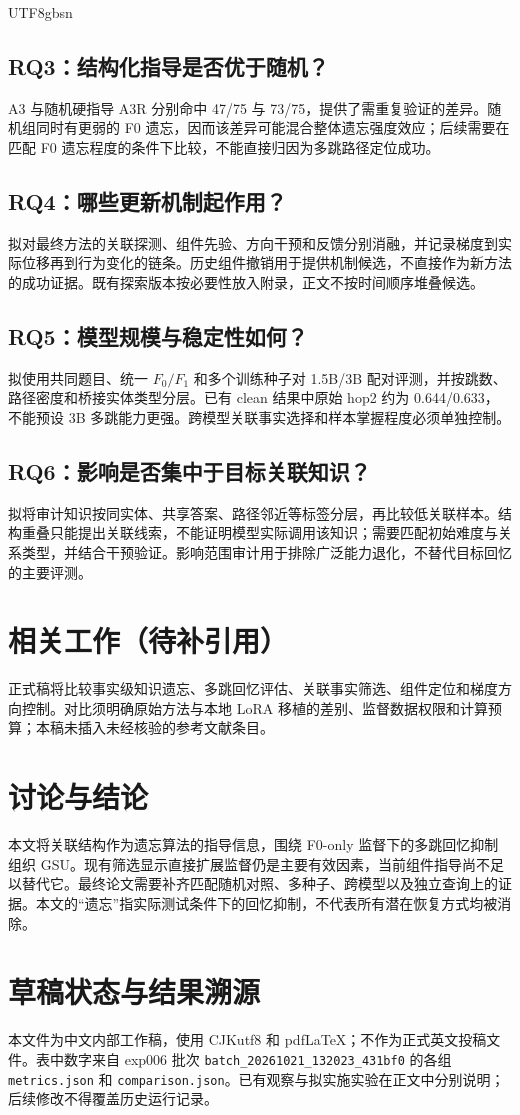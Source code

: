 \documentclass[sigconf,anonymous,review]{acmart}
\begin{document}
\begin{CJK*}{UTF8}{gbsn}
\subsection{RQ3：结构化指导是否优于随机？}
A3 与随机硬指导 A3R 分别命中 47/75 与 73/75，提供了需重复验证的差异。随机组同时有更弱的 F0 遗忘，因而该差异可能混合整体遗忘强度效应；后续需要在匹配 F0 遗忘程度的条件下比较，不能直接归因为多跳路径定位成功。

\subsection{RQ4：哪些更新机制起作用？}
拟对最终方法的关联探测、组件先验、方向干预和反馈分别消融，并记录梯度到实际位移再到行为变化的链条。历史组件撤销用于提供机制候选，不直接作为新方法的成功证据。既有探索版本按必要性放入附录，正文不按时间顺序堆叠候选。

\subsection{RQ5：模型规模与稳定性如何？}
拟使用共同题目、统一 $F_0/F_1$ 和多个训练种子对 1.5B/3B 配对评测，并按跳数、路径密度和桥接实体类型分层。已有 clean 结果中原始 hop2 约为 0.644/0.633，不能预设 3B 多跳能力更强。跨模型关联事实选择和样本掌握程度必须单独控制。

\subsection{RQ6：影响是否集中于目标关联知识？}
拟将审计知识按同实体、共享答案、路径邻近等标签分层，再比较低关联样本。结构重叠只能提出关联线索，不能证明模型实际调用该知识；需要匹配初始难度与关系类型，并结合干预验证。影响范围审计用于排除广泛能力退化，不替代目标回忆的主要评测。

\section{相关工作（待补引用）}
正式稿将比较事实级知识遗忘、多跳回忆评估、关联事实筛选、组件定位和梯度方向控制。对比须明确原始方法与本地 LoRA 移植的差别、监督数据权限和计算预算；本稿未插入未经核验的参考文献条目。

\section{讨论与结论}
本文将关联结构作为遗忘算法的指导信息，围绕 F0-only 监督下的多跳回忆抑制组织 GSU。现有筛选显示直接扩展监督仍是主要有效因素，当前组件指导尚不足以替代它。最终论文需要补齐匹配随机对照、多种子、跨模型以及独立查询上的证据。本文的“遗忘”指实际测试条件下的回忆抑制，不代表所有潜在恢复方式均被消除。

\appendix
\section{草稿状态与结果溯源}
本文件为中文内部工作稿，使用 CJKutf8 和 pdfLaTeX；不作为正式英文投稿文件。表中数字来自 exp006 批次 \nolinkurl{batch_20261021_132023_431bf0} 的各组 \nolinkurl{metrics.json} 和 \nolinkurl{comparison.json}。已有观察与拟实施实验在正文中分别说明；后续修改不得覆盖历史运行记录。
\end{CJK*}
\end{document}
